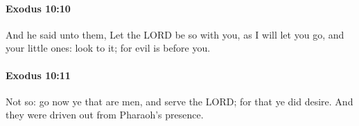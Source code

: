 		\paragraph{Exodus 10:10} %
			\label{EXODUS-10-10}

			And he said unto them, Let the LORD be so with you, as I will let you go, and your little ones: look to it; for evil is before you.


		\paragraph{Exodus 10:11} %
			\label{EXODUS-10-11}

			Not so: go now ye that are men, and serve the LORD; for that ye did desire. And they were driven out from Pharaoh's presence.


